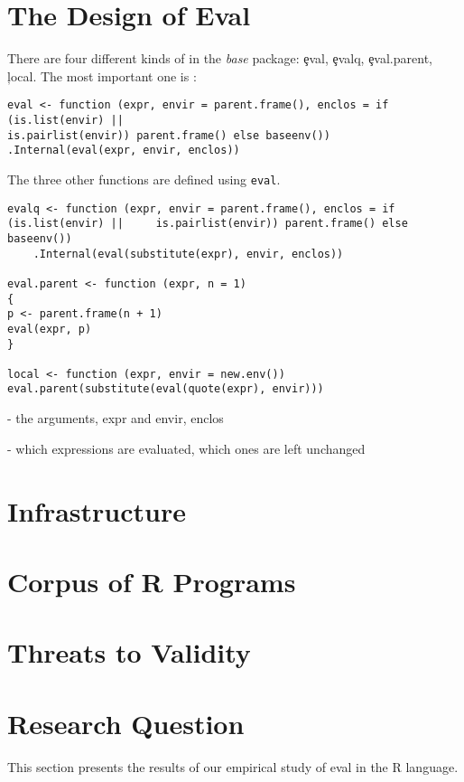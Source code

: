 \documentclass[conference]{IEEEtran}
\begin{document}
\section{The Design of Eval}

There are four different kinds of \eval in the \emph{base} package:  \c{eval}, \c{evalq}, \c{eval.parent},  \c{local}.
The most important one is \eval: 

\begin{lstlisting}
eval <- function (expr, envir = parent.frame(), enclos = if (is.list(envir) || 
is.pairlist(envir)) parent.frame() else baseenv()) 
.Internal(eval(expr, envir, enclos))
\end{lstlisting}




The three other functions are defined using \lstinline|eval|.

\begin{lstlisting}
evalq <- function (expr, envir = parent.frame(), enclos = if (is.list(envir) || 	is.pairlist(envir)) parent.frame() else baseenv()) 
	.Internal(eval(substitute(expr), envir, enclos))
	
eval.parent <- function (expr, n = 1) 
{
p <- parent.frame(n + 1)
eval(expr, p)
}

local <- function (expr, envir = new.env()) eval.parent(substitute(eval(quote(expr), envir)))
\end{lstlisting}


- the arguments, expr and envir, enclos


- which expressions are evaluated, which ones are left unchanged

\section{Infrastructure}


\section{Corpus of R Programs}


\section{Threats to Validity}


\section{Research Question}
This section presents the results of our empirical study of eval in the R language.
\end{document}
